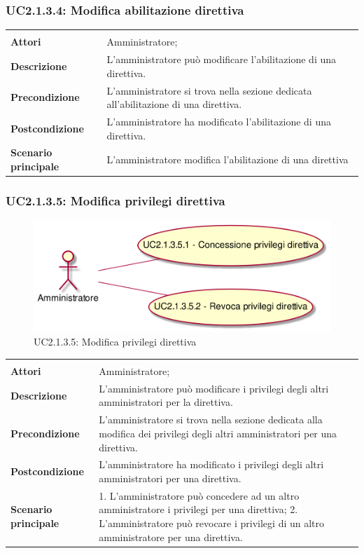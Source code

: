 \subsubsection{UC2.1.3.4: Modifica abilitazione direttiva}
\label{UC2.1.3.4}
\begin{longtable}{l|p{10cm}}
\hline
&\\
\textbf{Attori} & Amministratore;\\[7pt]
\textbf{Descrizione} & L'amministratore può modificare l'abilitazione di una direttiva.\\[7pt]
\textbf{Precondizione} & L'amministratore si trova nella sezione dedicata all'abilitazione di una direttiva.\\[7pt]
\textbf{Postcondizione} & L'amministratore ha modificato l'abilitazione di una direttiva.\\[7pt]
\textbf{Scenario principale} & L'amministratore modifica l'abilitazione di una direttiva\\[7pt]\hline
\end{longtable}

\subsubsection{UC2.1.3.5: Modifica privilegi direttiva}
\label{UC2.1.3.5}\newpage
\begin{figure}[h]
\centering
\includegraphics[width=\textwidth,height=\textheight,keepaspectratio]{images/UseCaseUC2.1.3.5.png}
\caption{UC2.1.3.5: Modifica privilegi direttiva}
\end{figure}
\begin{longtable}{l|p{10cm}}
\hline
&\\
\textbf{Attori} & Amministratore;\\[7pt]
\textbf{Descrizione} & L'amministratore può modificare i privilegi degli altri amministratori per la direttiva.\\[7pt]
\textbf{Precondizione} & L'amministratore si trova nella sezione dedicata alla modifica dei privilegi degli altri amministratori per una direttiva.\\[7pt]
\textbf{Postcondizione} & L'amministratore ha modificato i privilegi degli altri amministratori per una direttiva.\\[7pt]
\textbf{Scenario principale} & 1. L'amministratore può concedere ad un altro amministratore i privilegi per una direttiva;
2. L'amministratore può revocare i privilegi di un altro amministratore per una direttiva.\\[7pt]\hline
\end{longtable}

